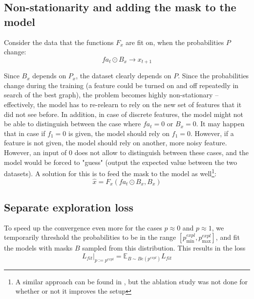 \documentclass[a4paper,11pt,oneside]{report}
\begin{document}
\subsection{Non-stationarity and adding the mask to the model}
Consider the data that the functions $F_x$ are fit on, when the probabilities $P$ change:
$$
fa_t\odot B_x\to x_{t+1}
$$

Since $B_x$ depends on $P_x$, the dataset clearly depends on $P$. Since the probabilities change during the training (a feature could be turned on and off repeatedly in search of the best graph), the problem becomes highly non-stationary -- effectively, the model has to re-relearn to rely on the new set of features that it did not see before. In addition, in case of discrete features, the model might not be able to distinguish between the case where $fa_t=0$ or $B_x=0$.
It may happen that in case if $f_1=0$ is given, the model should rely on $f_1=0$. However, if a feature is not given, the model should rely on another, more noisy feature.
However, an input of $0$ does not allow to distinguish between these cases, and the model would be forced to "guess" (output the expected value between the two datasets).
A solution for this is to feed the mask to the model as well\footnote{A similar approach can be found in \cite{Mooij2016,DeHaan2019}, but the ablation study was not done for whether or not it improves the setup}:
$$
\hat{x}=F_x(fa_t\odot B_x,B_x)
$$

\subsection{Separate exploration loss}
To speed up the convergence even more for the cases $p\approx 0$ and $p\approx 1$, we temporarily threshold the probabilities to be in the range $[p^{expl}_{\min},p^{expl}_{\max}]$, and fit the models with masks $B$ sampled from this distribution. This results in the loss
\begin{equation}
L_{fit}\big|_{p:=p^{expl}}=\mathbb E_{B\sim Be(p^{expl})} L_{fit}
\end{equation}
\end{document}
